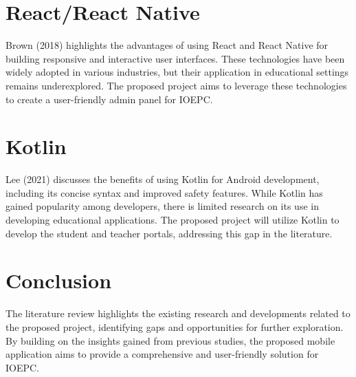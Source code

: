 \section{React/React Native}
Brown (2018) highlights the advantages of using React and React Native for building responsive and interactive user interfaces. These technologies have been widely adopted in various industries, but their application in educational settings remains underexplored. The proposed project aims to leverage these technologies to create a user-friendly admin panel for IOEPC.

\section{Kotlin}
Lee (2021) discusses the benefits of using Kotlin for Android development, including its concise syntax and improved safety features. While Kotlin has gained popularity among developers, there is limited research on its use in developing educational applications. The proposed project will utilize Kotlin to develop the student and teacher portals, addressing this gap in the literature.

\section{Conclusion}
The literature review highlights the existing research and developments related to the proposed project, identifying gaps and opportunities for further exploration. By building on the insights gained from previous studies, the proposed mobile application aims to provide a comprehensive and user-friendly solution for IOEPC.